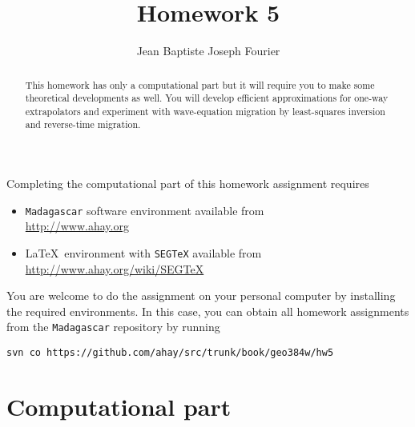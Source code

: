 \author{Jean Baptiste Joseph Fourier} 
\title{Homework 5}

\begin{abstract}
  This homework has only a computational part but it will require you
  to make some theoretical developments as well.  You will develop
  efficient approximations for one-way extrapolators and
  experiment with wave-equation migration by least-squares inversion
  and reverse-time migration.
\end{abstract}

Completing the computational part of this homework assignment requires
\begin{itemize}
\item \texttt{Madagascar} software environment available from \\
  \url{http://www.ahay.org}
\item \LaTeX\ environment with \texttt{SEGTeX} available from \\ 
  \url{http://www.ahay.org/wiki/SEGTeX}
\end{itemize}

You are welcome to do the assignment on your personal computer by
installing the required environments. In this case, you can obtain all
homework assignments from the \texttt{Madagascar} repository by running
\begin{verbatim}
svn co https://github.com/ahay/src/trunk/book/geo384w/hw5
\end{verbatim}

\section{Computational part}

